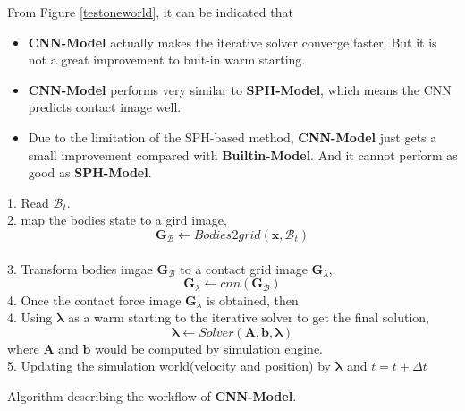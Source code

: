 From Figure \ref{testoneworld}, it can be indicated that 
\begin{itemize}
    \item \textbf{CNN-Model} actually makes the iterative solver converge faster. But it is not a great improvement to buit-in warm starting.
    \item \textbf{CNN-Model} performs very similar to \textbf{SPH-Model}, which means the CNN predicts contact image well. 
    \item Due to the limitation of the SPH-based method, \textbf{CNN-Model} just gets a small improvement compared with \textbf{Builtin-Model}. And it cannot perform as good as \textbf{SPH-Model}.
\end{itemize}

\begin{algorithm}[!ht]
        {
            1. Read $\mathcal{B}_t$. \\
            2. map the bodies state to a gird image,
                $$\pmb{G}_{\mathcal{B}} \gets Bodies2grid(\mathbf{x}, \mathcal{B}_t)$$ \\
            3. Transform bodies imgae $\pmb{G}_{\mathcal{B}}$ to a contact grid image $\pmb{G}_{\lambda}$,
            $$\pmb{G}_{\lambda} \gets cnn(\pmb{G}_{\mathcal{B}})$$
            4. Once the contact force image $\pmb{G}_{\lambda}$ is obtained,  then \\
            4. Using $\pmb{\lambda}$ as a warm starting to the iterative solver to get the final solution,
            $$\pmb{\lambda} \gets Solver(\pmb{A}, \pmb{b}, \pmb{\lambda})$$
            where $\pmb{A}$ and $\pmb{b}$ would be computed by simulation engine.\\
            5. Updating the simulation world(velocity and position) by $\pmb{\lambda}$ and $t = t+\Delta t$
        }
        \caption{Algorithm describing the workflow of \textbf{CNN-Model}.}
        \label{al:basic}
\end{algorithm}

